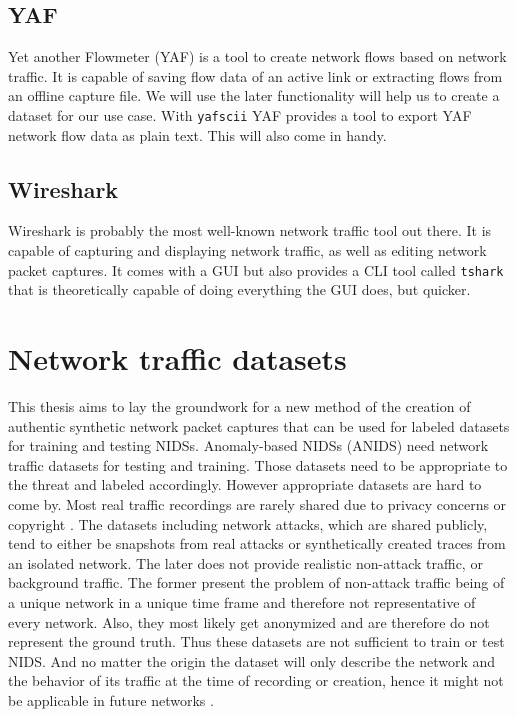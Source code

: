 \documentclass[
	ngerman,
	ruledheaders=section,%
	class=report,%
	thesis={type=bachelor},%
	accentcolor=9c,%
	custommargins=true,%
	marginpar=false,%
	parskip=half-,%
	fontsize=11pt,%
]{tudapub}
\begin{document}
\subsection{YAF}

Yet another Flowmeter (YAF) is a tool to create network flows based on network traffic.
It is capable of saving flow data of an active link or extracting flows from an offline capture file.
We will use the later functionality will help us to create a dataset for our use case.
With \lstinline{yafscii} YAF provides a tool to export YAF network flow data as plain text.
This will also come in handy.

\subsection{Wireshark}

Wireshark is probably the most well-known network traffic tool out there.
It is capable of capturing and displaying network traffic, as well as editing network packet captures.
It comes with a GUI but also provides a CLI tool called \lstinline{tshark} that is theoretically capable of doing everything the GUI does, but quicker.

\section{Network traffic datasets}

This thesis aims to lay the groundwork for a new method of the creation of authentic synthetic network packet captures
that can be used for labeled datasets for training and testing NIDSs.
Anomaly-based NIDSs (ANIDS) need network traffic datasets for testing and training.
Those datasets need to be appropriate to the threat and labeled accordingly.
However appropriate datasets are hard to come by.
Most real traffic recordings are rarely shared due to privacy concerns \cite{ringFlowbasedNetworkTraffic2019a} or copyright \cite{corderoID2TDIYDataset2015}.
The datasets including network attacks,
which are shared publicly,
tend to either be snapshots from real attacks or synthetically created traces from an isolated network.
The later does not provide realistic non-attack traffic, or background traffic.
The former present the problem of non-attack traffic being of a unique network in a unique time frame and therefore not representative of every network.
Also, they most likely get anonymized and are therefore do not represent the ground truth.
Thus these datasets are not sufficient to train or test NIDS.
And no matter the origin the dataset will only describe the network and the behavior of its traffic at the time of recording or creation, hence it might not be applicable in future networks \cite{ringFlowbasedNetworkTraffic2019a}.
\end{document}
